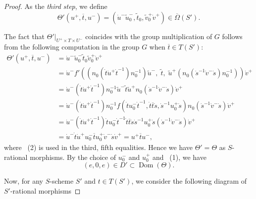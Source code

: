 \documentclass[11pt, reqno]{amsart}
\theoremstyle{plain}
\theoremstyle{definition}
\DeclareMathOperator{\Dom}{Dom} %
\begin{document}
\begin{proof}
    
    As the \emph{third step}, we define
    $$\Theta'(u^+, \overline{t}, u^-)=(\dot{u}^-\widetilde{u}^-_0,\widetilde{t}_0,\widetilde{v}^+_0\dot{v}^+)\in \overline{\Omega}(S').$$

    The fact that $\Theta'\vert_{U^+\times T\times U^-}$ coincides with the group multiplication of $G$ follows from the following computation in the group $G$ when $\overline{t}\in T(S')$:
    \begin{equation*}
       \begin{aligned}
        \Theta'(u^+, \overline{t}, u^-) 
        &=\dot{u}^-\widetilde{u}^-_0\widetilde{t}_0\widetilde{v}^+_0\dot{v}^+\\
        &= \dot{u}^-f'((n_0(\dot{t}\dot{u}^+\dot{t}^{-1})n_0^{-1})\widetilde{u}^-,\;\widetilde{t},\;\widetilde{u}^+(n_0(\dot{s}^{-1}\dot{v}^-\dot{s})n_0^{-1}))\dot{v}^+\\
        &= \dot{u}^- (\dot{t}\dot{u}^+\dot{t}^{-1})n_0^{-1}\widetilde{u}^-\widetilde{t}\widetilde{u}^+n_0(\dot{s}^{-1}\dot{v}^-\dot{s})  \dot{v}^+\\
        &= \dot{u}^- (\dot{t}\dot{u}^+\dot{t}^{-1})n_0^{-1}f(\dot{t}u_0^-\dot{t}^{-1}, \dot{t}\overline{t}\dot{s}, \dot{s}^{-1}u_0^+\dot{s})n_0(\dot{s}^{-1}\dot{v}^-\dot{s})  \dot{v}^+\\
        &= \dot{u}^- (\dot{t}\dot{u}^+\dot{t}^{-1})\dot{t}u_0^-\dot{t}^{-1}\dot{t}\overline{t}\dot{s} \dot{s}^{-1}u_0^+\dot{s}(\dot{s}^{-1}\dot{v}^-\dot{s})  \dot{v}^+\\
        &= \dot{u}^- \dot{t}\dot{u}^+u_0^-\overline{t}u_0^+\dot{v}^-\dot{s}\dot{v}^+
        =u^+\overline{t}u^-,
       \end{aligned}
    \end{equation*}
    where ~(2) is used in the third, fifth equalities. 
    Hence we have $\Theta'=\Theta$ as $S$-rational morphisms. By the choice of $u_0^-$ and $u_0^+$ and ~(1), we have $$ (e,0,e)\in D'\subset \Dom(\Theta).$$

    Now, for any $S$-scheme $S'$ and $t\in T(S')$, we consider the following diagram of $S'$-rational morphisms
    

\end{proof}
\end{document}
